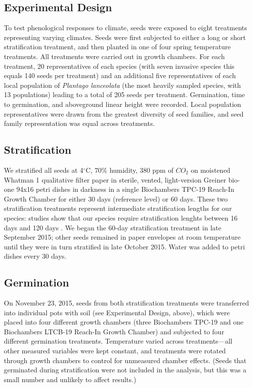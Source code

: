 \documentclass[12pt]{article}\usepackage[]{graphicx}\usepackage[]{color}
\begin{document}
	\subsection{Experimental Design} 
	To test phenological responses to climate, seeds were exposed to eight treatments representing varying climates. Seeds were first subjected to either a long or short stratification treatment, and then planted in one of four spring temperature treatments. All treatments were carried out in growth chambers. For each treatment, 20 representatives of each species (with seven invasive species this equals 140 seeds per treatment) and an additional five representatives of each local population of \textit{Plantago lanceolata} (the most heavily sampled species, with 13 populations) leading to a total of 205 seeds per treatment. Germination, time to germination, and aboveground linear height were recorded. Local population representatives were drawn from the greatest diversity of seed families, and seed family representation was equal across treatments. 
	
	\subsection{Stratification} 
	We stratified all seeds at 4$^\circ$C, 70\% humidity, 380 ppm of $CO_2$ \parencite[e.g.,][]{Meekins1999,Popay1970} on moistened Whatman 1 qualitative filter paper in sterile, vented, light-version Greiner bio-one 94x16 petri dishes in darkness \parencite{Baskin1998,Popay1970} in a single Biochambers TPC-19 Reach-In Growth Chamber for either 30 days (reference level) or 60 days. These two stratification treatments represent intermediate stratification lengths for our species: studies show that our species require stratification lenghts between 16 days \parencite{Popay1970} and 120 days \parencite{Meekins1999}. We began the 60-day stratification treatment in late September 2015; other seeds remained in paper envelopes at room temperature until they were in turn stratified in late October 2015.  Water was added to petri dishes every 30 days.
	
	\subsection{Germination}
	On November 23, 2015, seeds from both stratification treatments were transferred into individual pots with soil (see Experimental Design, above), which were placed into four different growth chambers (three Biochambers TPC-19 and one Biochambers LTCB-19 Reach-In Growth Chamber) and subjected to four different germination treatments. Temperature varied across treatments---all other measured variables were kept constant, and treatments were rotated through growth chambers to control for unmeasured chamber effects. (Seeds that germinated during stratification were not included in the analysis, but this was a small number and unlikely to affect results.)
	
\end{document}
